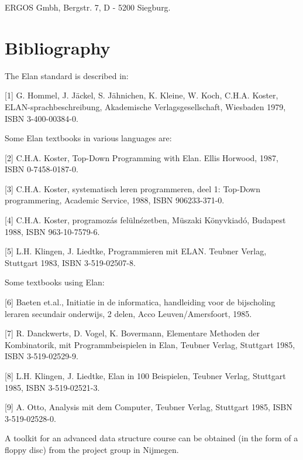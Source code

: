 \begin{literal}
ERGOS Gmbh,
Bergstr. 7,
D - 5200 Siegburg.
\end{literal}
\newpage

\section*{Bibliography}

\noindent
The Elan standard is described in:

\begin{literal}
\hspace{-\parindent}[1] %
G. Hommel, J. J\"{a}ckel, S. J\"{a}hnichen, K. Kleine, W. Koch, C.H.A. Koster,
ELAN-sprachbeschreibung,
Akademische Verlagsgesellschaft, Wiesbaden 1979, ISBN 3-400-00384-0.
\end{literal}

\noindent
Some Elan textbooks in various languages are:
 
\begin{literal}
\hspace{-\parindent}[2] %
C.H.A. Koster, Top-Down Programming with Elan.
Ellis Horwood, 1987, ISBN 0-7458-0187-0.

\hspace{-\parindent}[3] %
C.H.A. Koster, systematisch leren programmeren,
deel 1: Top-Down programmering,
Academic Service, 1988, ISBN 906233-371-0.

\hspace{-\parindent}[4] %
C.H.A. Koster, programoz\'{a}s fel\"{u}ln\'{e}zetben,
M\"{u}szaki K\"{o}nyvkiad\'{o}, Budapest 1988, ISBN 963-10-7579-6.

\hspace{-\parindent}[5] %
L.H. Klingen, J. Liedtke, Programmieren mit ELAN.
Teubner Verlag, Stuttgart 1983, ISBN 3-519-02507-8.
\end{literal}

\noindent
Some textbooks using Elan:

\begin{literal}
\hspace{-\parindent}[6] %
Baeten et.al., Initiatie in de informatica,
handleiding voor de bijscholing leraren secundair onderwijs,
2 delen, Acco Leuven/Amersfoort, 1985.

\hspace{-\parindent}[7] %
R. Danckwerts, D. Vogel, K. Bovermann,
Elementare Methoden der Kombinatorik, mit Programmbeispielen in Elan,
Teubner Verlag, Stuttgart 1985, ISBN 3-519-02529-9.

\hspace{-\parindent}[8] %
L.H. Klingen, J. Liedtke, Elan in 100 Beispielen,
Teubner Verlag, Stuttgart 1985, ISBN 3-519-02521-3.

\hspace{-\parindent}[9] %
A. Otto, Analysis mit dem Computer,
Teubner Verlag, Stuttgart 1985, ISBN 3-519-02528-0.
\end{literal}

\noindent
A toolkit for an advanced data structure course can be obtained (in the
form of a floppy disc) from the project group in Nijmegen.

